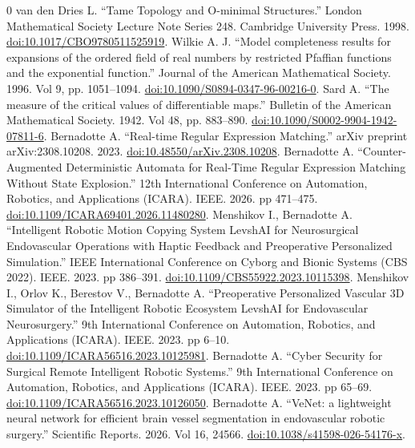 \documentclass{article}
\begin{document}
\begin{thebibliography}{0}
 van den Dries L. ``Tame Topology and O-minimal Structures.'' London Mathematical Society Lecture Note Series 248. Cambridge University Press. 1998. \href{https://doi.org/10.1017/CBO9780511525919}{doi:10.1017/CBO9780511525919}.
 Wilkie A. J. ``Model completeness results for expansions of the ordered field of real numbers by restricted Pfaffian functions and the exponential function.'' Journal of the American Mathematical Society. 1996. Vol 9, pp. 1051--1094. \href{https://doi.org/10.1090/S0894-0347-96-00216-0}{doi:10.1090/S0894-0347-96-00216-0}.
 Sard A. ``The measure of the critical values of differentiable maps.'' Bulletin of the American Mathematical Society. 1942. Vol 48, pp. 883--890. \href{https://doi.org/10.1090/S0002-9904-1942-07811-6}{doi:10.1090/S0002-9904-1942-07811-6}.
 Bernadotte A. ``Real-time Regular Expression Matching.'' arXiv preprint arXiv:2308.10208. 2023. \href{https://doi.org/10.48550/arXiv.2308.10208}{doi:10.48550/arXiv.2308.10208}.
 Bernadotte A. ``Counter-Augmented Deterministic Automata for Real-Time Regular Expression Matching Without State Explosion.'' 12th International Conference on Automation, Robotics, and Applications (ICARA). IEEE. 2026. pp 471--475. \href{https://doi.org/10.1109/ICARA69401.2026.11480280}{doi:10.1109/ICARA69401.2026.11480280}.
 Menshikov I., Bernadotte A. ``Intelligent Robotic Motion Copying System LevshAI for Neurosurgical Endovascular Operations with Haptic Feedback and Preoperative Personalized Simulation.'' IEEE International Conference on Cyborg and Bionic Systems (CBS 2022). IEEE. 2023. pp 386--391. \href{https://doi.org/10.1109/CBS55922.2023.10115398}{doi:10.1109/CBS55922.2023.10115398}.
 Menshikov I., Orlov K., Berestov V., Bernadotte A. ``Preoperative Personalized Vascular 3D Simulator of the Intelligent Robotic Ecosystem LevshAI for Endovascular Neurosurgery.'' 9th International Conference on Automation, Robotics, and Applications (ICARA). IEEE. 2023. pp 6--10. \href{https://doi.org/10.1109/ICARA56516.2023.10125981}{doi:10.1109/ICARA56516.2023.10125981}.
 Bernadotte A. ``Cyber Security for Surgical Remote Intelligent Robotic Systems.'' 9th International Conference on Automation, Robotics, and Applications (ICARA). IEEE. 2023. pp 65--69. \href{https://doi.org/10.1109/ICARA56516.2023.10126050}{doi:10.1109/ICARA56516.2023.10126050}.
 Bernadotte A. ``VeNet: a lightweight neural network for efficient brain vessel segmentation in endovascular robotic surgery.'' Scientific Reports. 2026. Vol 16, 24566. \href{https://doi.org/10.1038/s41598-026-54176-x}{doi:10.1038/s41598-026-54176-x}.

\end{thebibliography}
\end{document}
